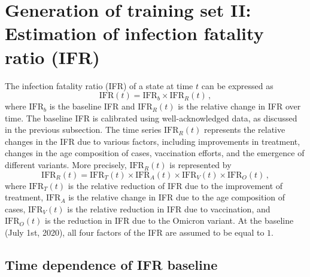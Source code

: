 \documentclass[sn-mathphys,Numbered]{sn-jnl}
\begin{document}




\section{Generation of training set II: Estimation of infection
  fatality ratio (IFR)}
\label{IFR}

The infection fatality ratio (IFR) of a state at time $t$ can be expressed as
$$
  \mathrm{IFR}(t) = \mathrm{IFR}_{b} \times \mathrm{IFR}_{R}(t) \,,
  $$
  where $\mathrm{IFR}_{b}$ is the baseline IFR and $\mathrm{IFR}_{R}(t)$ is the relative change in IFR over time. The baseline IFR is calibrated using well-acknowledged data, as discussed in the previous subsection. The time series $\mathrm{IFR}_R(t)$ represents the relative changes in the IFR due to various factors, including improvements in treatment, changes in the age composition of cases, vaccination efforts, and the emergence of different variants. More precisely, $\mathrm{IFR}_{R}(t)$ is represented by
$$
  \mathrm{IFR}_{R}(t) = \mathrm{IFR}_{T}(t) \times \mathrm{IFR}_{A}(t)
  \times \mathrm{IFR}_{V}(t) \times \mathrm{IFR}_{O}(t) \,,
$$
where $\mathrm{IFR}_{T}(t)$ is the relative reduction of IFR due to the improvement of treatment, $\mathrm{IFR}_{A}$ is the relative change in IFR due to the age composition of cases, $\mathrm{IFR}_{V}(t)$ is the relative reduction in IFR due to vaccination, and $\mathrm{IFR}_{O}(t)$ is the reduction in IFR due to the Omicron variant. At the baseline (July 1st, 2020), all four factors of the IFR are assumed to be equal to $1$. 

\subsection{Time dependence of IFR baseline}

\end{document}

